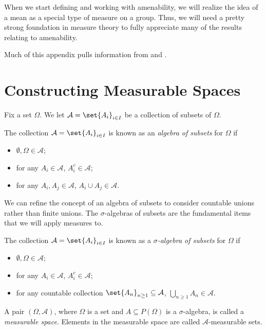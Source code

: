 When we start defining and working with amenability, we will realize the idea of a mean as a special type of measure on a group. Thus, we will need a pretty strong foundation in measure theory to fully appreciate many of the results relating to amenability.\newline

Much of this appendix pulls information from \cite{rainone_analysis} and \cite{folland_real_analysis}.
\section{Constructing Measurable Spaces}%
Fix a set $\Omega$. We let $\mathcal{A} =\set{A_{i}}_{i\in I}$ be a collection of subsets of $\Omega$.
\begin{definition}
  The collection $\mathcal{A} = \set{A_i}_{i\in I}$ is known as an \textit{algebra of subsets} for $\Omega$ if
  \begin{itemize}
    \item $\emptyset,\Omega \in \mathcal{A}$;
    \item for any $A_i\in \mathcal{A}$, $A_i^{c}\in \mathcal{A}$;
    \item for any $A_i,A_j\in \mathcal{A}$, $A_i \cup A_j \in \mathcal{A}$.
  \end{itemize}
\end{definition}
We can refine the concept of an algebra of subsets to consider countable unions rather than finite unions. The $\sigma$-algebras of subsets are the fundamental items that we will apply measures to.
\begin{definition}
  The collection $\mathcal{A} = \set{A_i}_{i\in I}$ is known as a \textit{$\sigma$-algebra of subsets} for $\Omega$ if
  \begin{itemize}
    \item $\emptyset,\Omega \in \mathcal{A}$;
    \item for any $A_i\in \mathcal{A}$, $A_i^{c}\in \mathcal{A}$;
    \item for any countable collection $\set{A_n}_{n\geq 1}\subseteq \mathcal{A}$, $\bigcup_{n\geq 1}A_{n} \in \mathcal{A}$.
  \end{itemize}
\end{definition}
\begin{definition}
A pair $\left(\Omega,\mathcal{A}\right)$, where $\Omega$ is a set and $A\subseteq P(\Omega)$ is a $\sigma$-algebra, is called a \textit{measurable space}. Elements in the measurable space are called $\mathcal{A}$-measurable sets.
\end{definition}
